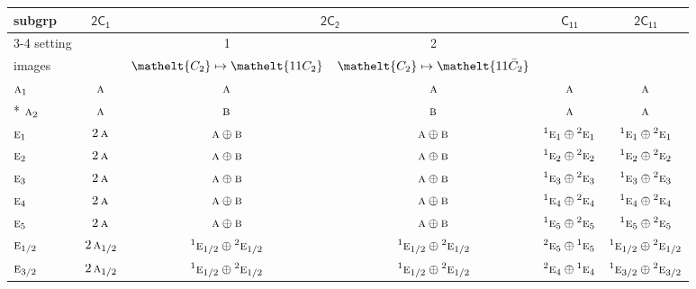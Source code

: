 \documentclass[10pt,a4paper]{article}
\numberwithin{equation}{section}
\newcommand{\eltfont}[1]{{\let\sigma\eltsigma\mathelt{#1}}}
\newcommand{\grp}[1]{\mathsf{#1}}
\newcommand{\irr}[1]{\text{\normalfont\scshape #1}}
\newcommand{\conjpair}[1]{{}^{#1}}
\newcommand{\cls}[1]{\eltfont{#1}}
\newcommand{\barred}[1]{\bar{#1}}
\begin{document}
{\small\begin{longtable}{@{}lccccc@{}}\toprule
subgrp & \href{2C1.pdf}{$\grp{2C_{1}}$} & \multicolumn{2}{c}{\href{2C2.pdf}{$\grp{2C_{2}}$}} & \href{C11.pdf}{$\grp{C_{11}}$} & \href{2C11.pdf}{$\grp{2C_{11}}$}\\\cmidrule(lr){3-4}
setting &  & 1 & 2 &  & \\
images &  & {\scriptsize $\cls{C_{2}} \mapsto \cls{11C_{2}}$} & {\scriptsize $\cls{C_{2}} \mapsto \cls{11\barred{C}_{2}}$} &  & \\\midrule\endhead
\bottomrule\endfoot\endlastfoot
$\irr{a}_{1}$ & $\irr{a}$ & $\irr{a}$ & $\irr{a}$ & $\irr{a}$ & $\irr{a}$\\*
$\irr{a}_{2}$ & $\irr{a}$ & $\irr{b}$ & $\irr{b}$ & $\irr{a}$ & $\irr{a}$\\
$\irr{e}_{1}$ & $2\,\irr{a}$ & $\irr{a}\oplus \irr{b}$ & $\irr{a}\oplus \irr{b}$ & $\conjpair{1}\irr{e}_{1}\oplus \conjpair{2}\irr{e}_{1}$ & $\conjpair{1}\irr{e}_{1}\oplus \conjpair{2}\irr{e}_{1}$\\
$\irr{e}_{2}$ & $2\,\irr{a}$ & $\irr{a}\oplus \irr{b}$ & $\irr{a}\oplus \irr{b}$ & $\conjpair{1}\irr{e}_{2}\oplus \conjpair{2}\irr{e}_{2}$ & $\conjpair{1}\irr{e}_{2}\oplus \conjpair{2}\irr{e}_{2}$\\
$\irr{e}_{3}$ & $2\,\irr{a}$ & $\irr{a}\oplus \irr{b}$ & $\irr{a}\oplus \irr{b}$ & $\conjpair{1}\irr{e}_{3}\oplus \conjpair{2}\irr{e}_{3}$ & $\conjpair{1}\irr{e}_{3}\oplus \conjpair{2}\irr{e}_{3}$\\
$\irr{e}_{4}$ & $2\,\irr{a}$ & $\irr{a}\oplus \irr{b}$ & $\irr{a}\oplus \irr{b}$ & $\conjpair{1}\irr{e}_{4}\oplus \conjpair{2}\irr{e}_{4}$ & $\conjpair{1}\irr{e}_{4}\oplus \conjpair{2}\irr{e}_{4}$\\
$\irr{e}_{5}$ & $2\,\irr{a}$ & $\irr{a}\oplus \irr{b}$ & $\irr{a}\oplus \irr{b}$ & $\conjpair{1}\irr{e}_{5}\oplus \conjpair{2}\irr{e}_{5}$ & $\conjpair{1}\irr{e}_{5}\oplus \conjpair{2}\irr{e}_{5}$\\
$\irr{e}_{1/2}$ & $2\,\irr{a}_{1/2}$ & $\conjpair{1}\irr{e}_{1/2}\oplus \conjpair{2}\irr{e}_{1/2}$ & $\conjpair{1}\irr{e}_{1/2}\oplus \conjpair{2}\irr{e}_{1/2}$ & $\conjpair{2}\irr{e}_{5}\oplus \conjpair{1}\irr{e}_{5}$ & $\conjpair{1}\irr{e}_{1/2}\oplus \conjpair{2}\irr{e}_{1/2}$\\
$\irr{e}_{3/2}$ & $2\,\irr{a}_{1/2}$ & $\conjpair{1}\irr{e}_{1/2}\oplus \conjpair{2}\irr{e}_{1/2}$ & $\conjpair{1}\irr{e}_{1/2}\oplus \conjpair{2}\irr{e}_{1/2}$ & $\conjpair{2}\irr{e}_{4}\oplus \conjpair{1}\irr{e}_{4}$ & $\conjpair{1}\irr{e}_{3/2}\oplus \conjpair{2}\irr{e}_{3/2}$\\

\end{longtable}}
\end{document}
